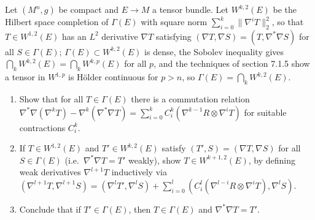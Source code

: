 \begin{remark}[Exercise 9.6.4]
  \label{rem:pet-ch9-exercise-9-6-4}
  Let $(M^n,g)$ be compact and $E\to M$ a tensor bundle. Let $W^{k,2}(E)$ be the
  Hilbert space completion of $\Gamma(E)$ with square norm
  $\sum_{i=0}^k\|\nabla^iT\|_2^2$, so that $T\in W^{1,2}(E)$ has an $L^2$
  derivative $\nabla T$ satisfying $(\nabla T,\nabla S)=(T,\nabla^*\nabla S)$ for
  all $S\in\Gamma(E)$; $\Gamma(E)\subset W^{k,2}(E)$ is dense, the Sobolev
  inequality gives $\bigcap_kW^{k,2}(E)=\bigcap_kW^{k,p}(E)$ for all $p$, and
  the techniques of section 7.1.5 show a tensor in $W^{1,p}$ is H\"older
  continuous for $p>n$, so $\Gamma(E)=\bigcap_kW^{k,2}(E)$.
  \begin{enumerate}
    \item[(1)] Show that for all $T\in\Gamma(E)$ there is a commutation
      relation $\nabla^*\nabla(\nabla^kT)-\nabla^k(\nabla^*\nabla T)
      =\sum_{i=0}^kC_i^k(\nabla^{k-1}R\otimes\nabla^iT)$ for suitable
      contractions $C_i^k$.
    \item[(2)] If $T\in W^{1,2}(E)$ and $T'\in W^{k,2}(E)$ satisfy
      $(T',S)=(\nabla T,\nabla S)$ for all $S\in\Gamma(E)$ (i.e.\
      $\nabla^*\nabla T=T'$ weakly), show $T\in W^{k+1,2}(E)$, by defining weak
      derivatives $\nabla^{l+1}T$ inductively via
      $(\nabla^{l+1}T,\nabla^{l+1}S)=(\nabla^lT',\nabla^lS)
      +\sum_{i=0}^l(C_i^l(\nabla^{l-i}R\otimes\nabla^iT),\nabla^lS)$.
    \item[(3)] Conclude that if $T'\in\Gamma(E)$, then $T\in\Gamma(E)$ and
      $\nabla^*\nabla T=T'$.
  \end{enumerate}
\end{remark}

